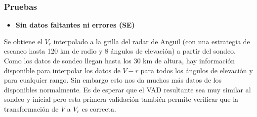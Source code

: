 \documentclass[12pt,spanish,oneside]{book}
\providecommand{\tightlist}{%
  \setlength{\itemsep}{0pt}\setlength{\parskip}{0pt}}
\begin{document}
\subsubsection{Pruebas}\label{pruebas}

\begin{itemize}
\tightlist
\item
  \textbf{Sin datos faltantes ni errores (SE)}
\end{itemize}

Se obtiene el \(V_r\) interpolado a la grilla del radar de Anguil (con
una estrategia de escaneo hasta 120 km de radio y 8 ángulos de
elevación) a partir del sondeo. Como los datos de sondeo llegan hasta
los 30 km de altura, hay información disponible para interpolar los
datos de \(V-r\) para todos los ángulos de elevación y para cualquier
rango. Sin embargo esto nos da muchos más datos de los disponibles
normalmente. Es de esperar que el VAD resultante sea muy similar al
sondeo y inicial pero esta primera validación también permite verificar
que la transformación de \(V\) a \(V_r\) es correcta.
\end{document}
